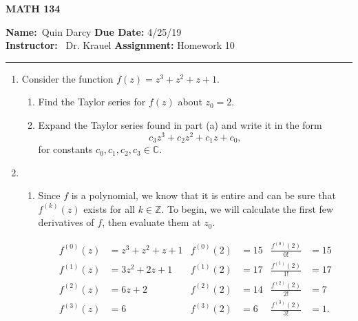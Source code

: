 \documentclass[12pt]{article}
\makeatletter
\theoremstyle{definition}
\theoremstyle{remark}
\newenvironment{solution}[1][\bf{\textit{Solution}}]{\par
  
  \normalfont \topsep6\p@\@plus6\p@\relax
  \list{}{\leftmargin=0mm
          \rightmargin=0mm
          \settowidth{\itemindent}{\itshape#1}%
          \labelwidth=\itemindent
          \parsep=0pt \listparindent=\parindent 
  }
  \item[\hskip\labelsep
        \itshape
    #1\@addpunct{.}]\ignorespaces
}{%
  \popQED\endlist\@endpefalse
}
\makeatother
\begin{document}
\begin{center}
	\vspace{.4cm} {\textbf { \large MATH 134}}
\end{center}
{\textbf{Name:}\ Quin Darcy \hspace{\fill} \textbf{Due Date:} 4/25/19   \\
{ \textbf{Instructor:}} \ Dr. Krauel \hspace{\fill} \textbf{Assignment:} Homework 10 \\ \hrule}

\justifying


    \begin{enumerate}[leftmargin=*]
        \item Consider the function $f(z)=z^3+z^2+z+1$.
            \begin{enumerate}[label=(\alph*)]
                \item Find the Taylor series for $f(z)$ about $z_0=2$.
                \item Expand the Taylor series found in part (a) and write it in the form               \begin{equation*}
                        c_3z^3+c_2z^2+c_1z+c_0,
                    \end{equation*} 
                \noindent for constants $c_0,c_1,c_2,c_3\in\mathbb{C}$.
            \end{enumerate}
            
            \begin{solution}\hfill\par
                \begin{enumerate}[label=(\alph*), leftmargin=9mm]
                    \item Since $f$ is a polynomial, we know that it is entire and can be sure that $f^{(k)}(z)$ exists for all $k\in\mathbb{Z}$. To begin, we will calculate the first few derivatives of $f$, then evaluate them at $z_0$.
                    
                    \begin{align*}
                        f^{(0)}(z) &= z^3+z^2 + z + 1  &f^{(0)}(2) &= 15 &\frac{f^{(0)}(2)}{0!} &= 15\\
                        f^{(1)}(z) &= 3z^2 + 2z + 1 &f^{(1)}(2) &= 17 &\frac{f^{(1)}(2)}{1!} &= 17\\
                        f^{(2)}(z) &= 6z + 2 &f^{(2)}(2) &= 14 &\frac{f^{(2)}(2)}{2!} &= 7\\
                        f^{(3)}(z) &= 6 &f^{(3)}(2) &= 6 &\frac{f^{(3)}(2)}{3!} &= 1.
                    \end{align*}
                    

\end{enumerate}
\end{solution}
\end{enumerate}
\end{document}
